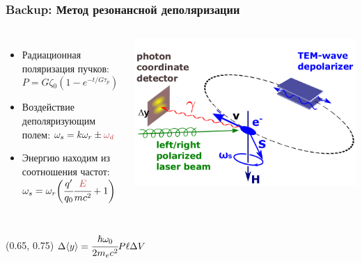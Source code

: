 \documentclass[12pt,aspectratio=169]{beamer}
\begin{document}
\begin{frame}[t]
	\frametitle{Backup: Метод резонансной деполяризации}
	\begin{columns}
		\begin{minipage}[t][0.5\textheight]{\linewidth}
			\begin{itemize}
				\item Радиационная поляризация пучков: 
				$P = G \zeta{_0}(1-e^{-t/G\tau_p})$
				\item Воздействие деполяризующим полем:
				$\omega_s=  k\omega_{r} \pm \textcolor{calmRed}{\omega_d}$
				\item Энергию находим из соотношения частот:
				$\omega_s=  \omega_{r}\bigg(\cfrac{q'}{q_0}\cfrac{\textcolor{calmRed}{E}}{mc^2}+1\bigg)$
			\end{itemize}
		\end{minipage}%
		\begin{minipage}[t][0.5\textheight]{\linewidth}
			\includegraphics[width=1\linewidth]{mrd-lsrp.png}
		\end{minipage}%
	\end{columns}
	\begin{textblock*}{0.45\paperwidth}(0.65\paperwidth, 0.75\paperheight)
		$\Delta \langle y \rangle = \cfrac{\hbar\omega_0}{2m_e c^2}P\ell\Delta V$ 
	\end{textblock*}
	
\end{frame}
\end{document}
